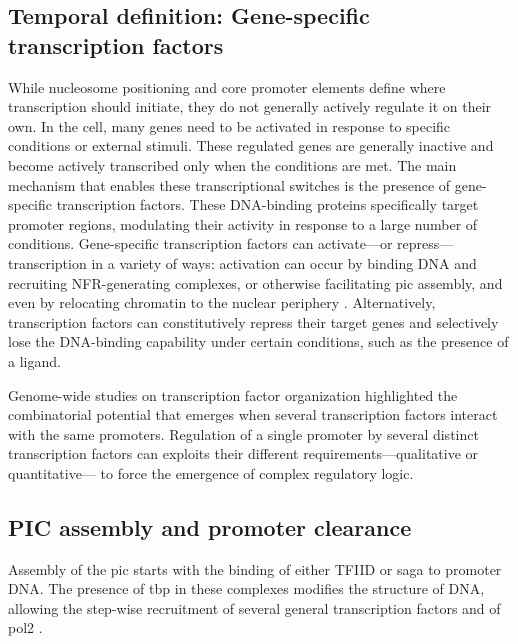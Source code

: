 \subsection{Temporal definition: Gene-specific transcription factors}
While nucleosome positioning and core promoter elements define where transcription should initiate, they do not generally actively regulate it on their own.  
In the cell, many genes need to be activated in response to specific conditions or external stimuli.
These regulated genes are generally inactive and become actively transcribed only when the conditions are met.
The main mechanism that enables these transcriptional switches is the presence of gene-specific transcription factors.
These DNA-binding proteins specifically target promoter regions, modulating their activity in response to a large number of conditions.
Gene-specific transcription factors can activate---or repress---transcription in a variety of ways: activation can occur by binding DNA and recruiting NFR-generating complexes, or otherwise facilitating \gls{pic} assembly, and even by relocating chromatin to the nuclear periphery \citep{randisehinchliff:2016:transcription}.
Alternatively, transcription factors can constitutively repress their target genes and selectively lose the DNA-binding capability under certain conditions, such as the presence of a ligand.

Genome-wide studies on transcription factor organization highlighted the combinatorial potential that emerges when several transcription factors interact with the same promoters\cite{harbison:2004:transcriptional}.
Regulation of a single promoter by several distinct transcription factors can exploits their different requirements---qualitative or quantitative--- to force the emergence of complex regulatory logic.

\subsection{PIC assembly and promoter clearance}
Assembly of the \acrlong{pic} starts with the binding of either TFIID or \gls{saga} to promoter DNA.
The presence of \gls{tbp} in these complexes modifies the structure of DNA, allowing the step-wise recruitment of several general transcription factors and of \gls{pol2} \citep[For review see][]{sainsbury:2015:structural}.

